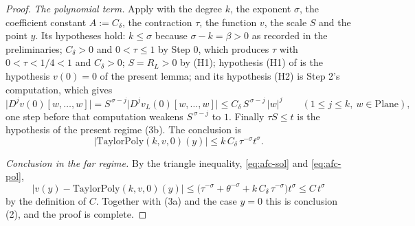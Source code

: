 \begin{proof}
\emph{The polynomial term.}  Apply  with the degree $k$, the
exponent $\sigma$, the coefficient constant $A:=C_\delta$, the contraction $\tau$, the function
$v$, the scale $S$ and the point $y$.  Its hypotheses hold: $k\le\sigma$ because
$\sigma-k=\beta>0$ as recorded in the preliminaries; $C_\delta>0$ and $0<\tau\le1$ by Step 0,
which produces $\tau$ with $0<\tau<1/4<1$ and $C_\delta>0$; $S=R_L>0$ by (H1); hypothesis (H1)
of  is the hypothesis $v(0)=0$ of the present lemma; and its
hypothesis (H2) is Step 2's computation, which gives
\[
  \bigl\lvert D^{j}v(0)[w,\ldots,w]\bigr\rvert
  =S^{\,\sigma-j}\bigl\lvert D^{j}v_L(0)[w,\ldots,w]\bigr\rvert
  \le C_\delta\,S^{\,\sigma-j}\,\lvert w\rvert^{j}
  \qquad(1\le j\le k,\ w\in\mathrm{Plane}),
\]
one step before that computation weakens $S^{\,\sigma-j}$ to $1$.  Finally $\tau S\le t$ is the
hypothesis of the present regime (3b).  The conclusion is
\begin{equation}\label{eq:afc-pol}
  \bigl\lvert\mathrm{TaylorPoly}(k,v,0)(y)\bigr\rvert\le k\,C_\delta\,\tau^{-\sigma}t^{\sigma}.
\end{equation}

\emph{Conclusion in the far regime.}  By the triangle inequality, \eqref{eq:afc-sol} and
\eqref{eq:afc-pol},
\[
  \bigl\lvert v(y)-\mathrm{TaylorPoly}(k,v,0)(y)\bigr\rvert
  \le\bigl(\tau^{-\sigma}+\theta^{-\sigma}+k\,C_\delta\,\tau^{-\sigma}\bigr)t^{\sigma}
  \le C\,t^{\sigma}
\]
by the definition of $C$.  Together with (3a) and the case $y=0$ this is conclusion (2), and the
proof is complete.
\end{proof}

